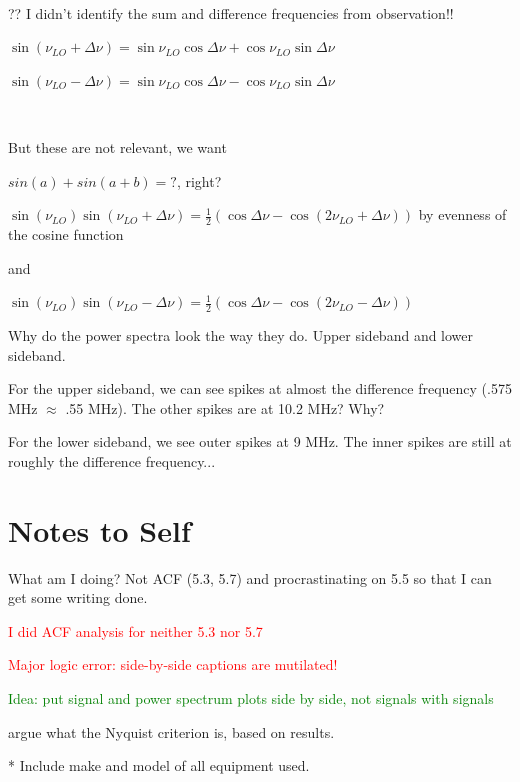 \documentclass[a4paper]{article}
\begin{document}
\

?? I didn't identify the sum and difference frequencies from observation!!

$\sin(\nu_{LO} + \Delta \nu) = \sin \nu_{LO} \cos \Delta \nu + \cos \nu_{LO} \sin \Delta \nu$

$\sin(\nu_{LO} - \Delta \nu) = \sin \nu_{LO} \cos \Delta \nu - \cos \nu_{LO} \sin \Delta \nu$

\

But these are not relevant, we want

$sin(a) + sin(a + b) = ?$, right?

$\sin(\nu_{LO}) \sin(\nu_{LO} + \Delta \nu) = \frac{1}{2} (\cos \Delta \nu - \cos (2\nu_{LO} + \Delta \nu))$ by evenness of the cosine function

and

$\sin(\nu_{LO}) \sin(\nu_{LO} - \Delta \nu) = \frac{1}{2} (\cos \Delta \nu - \cos (2\nu_{LO} - \Delta \nu))$

Why do the power spectra look the way they do. Upper sideband and lower sideband.

For the upper sideband, we can see spikes at almost the difference frequency (.575 MHz $\approx$ .55 MHz). The other spikes are at 10.2 MHz? Why?

For the lower sideband, we see outer spikes at 9 MHz. The inner spikes are still at roughly the difference frequency...

\section{Notes to Self}


What am I doing? Not ACF (5.3, 5.7) and procrastinating on 5.5 so that I can get some writing done.

\textcolor{red}{I did ACF analysis for neither 5.3 nor 5.7}

\textcolor{red}{Major logic error: side-by-side captions are mutilated!}

\textcolor{green}{Idea: put signal and power spectrum plots side by side, not signals with signals}



argue what the Nyquist criterion is, based on results.

* Include make and model of all equipment used.
\end{document}
